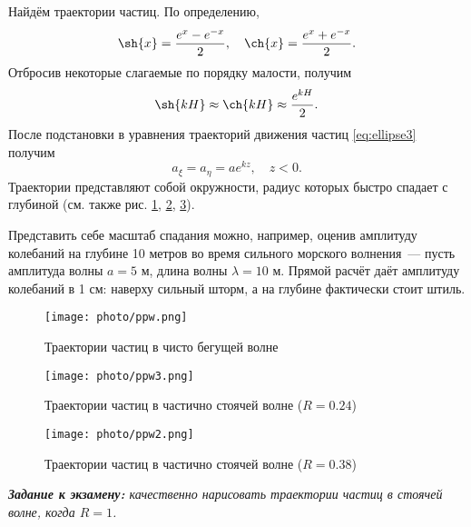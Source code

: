 Найдём траектории частиц. По определению,
\begin{equation}
    \sh{x} = \frac{e^x-e^{-x}}{2}, \quad \ch{x} = \frac{e^x+e^{-x}}{2}.
\end{equation}
Отбросив некоторые слагаемые по порядку малости, получим
\begin{equation}
    \sh{kH}\approx\ch{kH}\approx \frac{e^{kH}}{2}.
\end{equation}
После подстановки в уравнения траекторий движения частиц \eqref{eq:ellipse3} получим
\begin{equation}
    a_\xi = a_\eta = ae^{kz}, \quad z<0.
\end{equation}
Траектории представляют собой окружности, радиус которых быстро спадает с глубиной (см. также рис. \ref{fig:ppw}, \ref{fig:ppw2}, \ref{fig:ppw3}).

Представить себе масштаб спадания можно, например, оценив амплитуду колебаний на глубине 10 метров во время сильного морского волнения~--- пусть амплитуда волны $a=5$ м, длина волны $\lambda=10$ м. Прямой расчёт даёт амплитуду колебаний в 1 см: наверху сильный шторм, а на глубине фактически стоит штиль.

\begin{figure}[H]
    \centering
    \texttt{[image: photo/ppw.png]}
    \caption{Траектории частиц в чисто бегущей волне}
    \label{fig:ppw}
\end{figure}

\begin{figure}[H]
    \centering
    \texttt{[image: photo/ppw3.png]}
    \caption{Траектории частиц в частично стоячей волне ($R=0.24$)}
    \label{fig:ppw2}
\end{figure}

\begin{figure}[H]
    \centering
    \texttt{[image: photo/ppw2.png]}
    \caption{Траектории частиц в частично стоячей волне ($R=0.38$)}
    \label{fig:ppw3}
\end{figure}

\textit{\textbf{Задание к экзамену:} качественно нарисовать траектории частиц в стоячей волне, когда $R=1$.}

